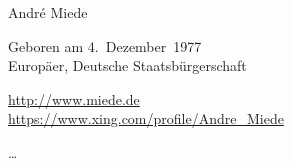 \documentclass[10pt,a4paper]{scrartcl}
\begin{document}
    \begin{cv}{}
        \begin{cvlist}{}\label{PersDat}  
            \item   Andr\'e Miede
            \item   Geboren am 4.\ Dezember~1977 \\	
                    Europ\"aer, Deutsche Staatsb\"urgerschaft 
            \item   \url{http://www.miede.de} \\				
                    \url{https://www.xing.com/profile/Andre_Miede}				
        \end{cvlist}
        
        \begin{cvlist}{}\label{irgendwas}
            \item   \dots
        \end{cvlist}
    \end{cv}
\end{document}
